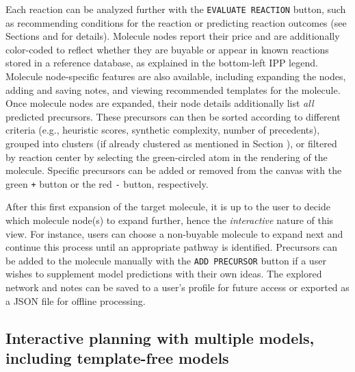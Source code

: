\documentclass[pdflatex,sn-mathphys-num]{sn-jnl}%
\theoremstyle{thmstyleone}%
\theoremstyle{thmstyletwo}%
\theoremstyle{thmstylethree}%
\begin{document}
Each reaction can be analyzed further with the \texttt{EVALUATE REACTION} button, such as recommending conditions for the reaction or predicting reaction outcomes (see Sections  and  for details). Molecule nodes report their price and are additionally color-coded to reflect whether they are buyable or appear in known reactions stored in a reference database, as explained in the bottom-left IPP legend. Molecule node-specific features are also available, including expanding the nodes, adding and saving notes, and viewing recommended templates for the molecule. Once molecule nodes are expanded, their node details additionally list \emph{all} predicted precursors. These precursors can then be sorted according to different criteria (e.g., heuristic scores, synthetic complexity, number of precedents), grouped into clusters (if already clustered as mentioned in Section ), or filtered by reaction center by selecting the green-circled atom in the rendering of the molecule. Specific precursors can be added or removed from the canvas with the green \texttt{+} button or the red \texttt{-} button, respectively. 

After this first expansion of the target molecule, it is up to the user to decide which molecule node(s) to expand further, hence the \emph{interactive} nature of this view. For instance, users can choose a non-buyable molecule to expand next and continue this process until an appropriate pathway is identified. Precursors can be added to the molecule manually with the \texttt{ADD PRECURSOR} button if a user wishes to supplement model predictions with their own ideas. The explored network and notes can be saved to a user's profile for future access or exported as a JSON file for offline processing. 

\subsection{Interactive planning with multiple models, including template-free models}\label{results_ipp_multiple}

\end{document}
